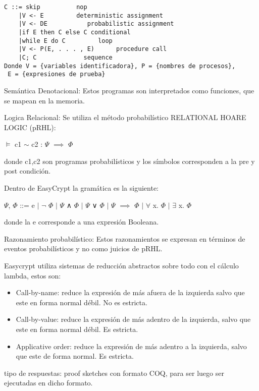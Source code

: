 \documentclass[runningheads,a4paper]{llncs}
\begin{document}
\begin{Verbatim}
C ::= skip		 	nop
	|V <- E		    deterministic assignment
	|V <- DE		   probabilistic assignment
	|if E then C else C	conditional
	|while E do C	      loop
	|V <- P(E, . . . , E)      procedure call
	|C; C		      sequence
Donde V = {variables identificadora}, P = {nombres de procesos},
 E = {expresiones de prueba}
\end{Verbatim}

Semántica Denotacional:
Estos programas son interpretados como funciones, que se mapean en la memoria.

Logica Relacional: Se utiliza el método probabilístico RELATIONAL HOARE LOGIC (pRHL):
		
\centerline{$\models$ c1 $\sim$ c2 : $\Psi$ $\implies$ $\Phi$}	
			
donde c1,c2 son programas probabilísticos y los símbolos corresponden a la pre y post condición.

Dentro de EasyCrypt la gramática es la siguiente:

\centerline{$\Psi$, $\Phi$ ::= e $\mid$ $\neg$ $\Phi$ $\mid$ $\Psi$ ∧ $\Phi$ $\mid$ $\Psi$ ∨ $\Phi$ $\mid$ $\Psi$ $\implies$ $\Phi$ $\mid$ $\forall$ x. $\Phi$ $\mid$ $\exists$ x. $\Phi$}

donde la e corresponde a una expresión Booleana.


Razonamiento probabilístico:
Estos razonamientos se expresan en términos de eventos probabilísticos y no como juicios de pRHL.\cite{article3}


Easycrypt utiliza sistemas de reducción abstractos sobre todo con el cálculo lambda, estos son:

\begin{itemize}

	\item Call-by-name: reduce la expresión de más afuera de la izquierda salvo que este en forma normal débil. No es estricta.

	\item Call-by-value: reduce la expresión de más adentro de la izquierda, salvo que este en forma normal débil. Es estricta.

	\item Applicative order: reduce la expresión de más adentro a la izquierda, salvo que este de forma normal. Es estricta.
\end{itemize}

tipo de respuestas: proof sketches con formato COQ, para ser luego ser ejecutadas en dicho formato.\cite{article4}
\end{document}
